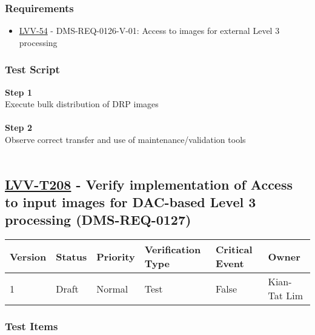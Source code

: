 \hypertarget{requirements-107}{%
\subsubsection{Requirements}\label{requirements-107}}

\begin{itemize}
\tightlist
\item
  \href{https://jira.lsstcorp.org/browse/LVV-54}{LVV-54} -
  DMS-REQ-0126-V-01: Access to images for external Level 3 processing
\end{itemize}

\hypertarget{test-script-107}{%
\subsubsection{Test Script}\label{test-script-107}}

\textbf{Step 1}\\
Execute bulk distribution of DRP images\\
~\\
\textbf{Step 2}\\
Observe correct transfer and use of maintenance/validation tools\\
~\\

\hypertarget{lvv-t208---verify-implementation-of-access-to-input-images-for-dac-based-level-3-processing-dms-req-0127}{%
\subsection{\texorpdfstring{\href{https://jira.lsstcorp.org/secure/Tests.jspa\#/testCase/LVV-T208}{LVV-T208}
- Verify implementation of Access to input images for DAC-based Level 3
processing
(DMS-REQ-0127)}{LVV-T208 - Verify implementation of Access to input images for DAC-based Level 3 processing (DMS-REQ-0127)}}\label{lvv-t208---verify-implementation-of-access-to-input-images-for-dac-based-level-3-processing-dms-req-0127}}

\begin{longtable}[]{@{}llllll@{}}
\toprule
Version & Status & Priority & Verification Type & Critical Event &
Owner\tabularnewline
\midrule
\endhead
1 & Draft & Normal & Test & False & Kian-Tat Lim\tabularnewline
\bottomrule
\end{longtable}

\hypertarget{test-items-108}{%
\subsubsection{Test Items}\label{test-items-108}}

